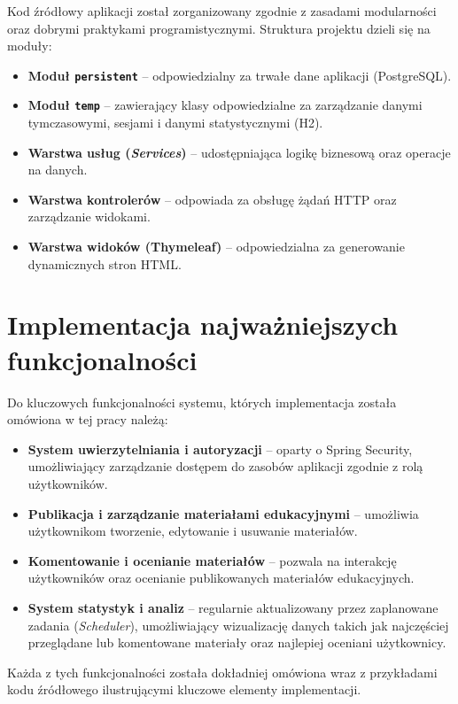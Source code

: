 Kod źródłowy aplikacji został zorganizowany zgodnie z zasadami modularności oraz dobrymi praktykami programistycznymi. Struktura projektu dzieli się na moduły:

\begin{itemize}
    \item \textbf{Moduł \texttt{persistent}} – odpowiedzialny za trwałe dane aplikacji (PostgreSQL).
    \item \textbf{Moduł \texttt{temp}} – zawierający klasy odpowiedzialne za zarządzanie danymi tymczasowymi, sesjami i danymi statystycznymi (H2).
    \item \textbf{Warstwa usług (\textit{Services})} – udostępniająca logikę biznesową oraz operacje na danych.
    \item \textbf{Warstwa kontrolerów} – odpowiada za obsługę żądań HTTP oraz zarządzanie widokami.
    \item \textbf{Warstwa widoków (Thymeleaf)} – odpowiedzialna za generowanie dynamicznych stron HTML.
\end{itemize}

\section{Implementacja najważniejszych funkcjonalności}

Do kluczowych funkcjonalności systemu, których implementacja została omówiona w tej pracy należą:

\begin{itemize}
    \item \textbf{System uwierzytelniania i autoryzacji} – oparty o Spring Security, umożliwiający zarządzanie dostępem do zasobów aplikacji zgodnie z rolą użytkowników.
    \item \textbf{Publikacja i zarządzanie materiałami edukacyjnymi} – umożliwia użytkownikom tworzenie, edytowanie i usuwanie materiałów.
    \item \textbf{Komentowanie i ocenianie materiałów} – pozwala na interakcję użytkowników oraz ocenianie publikowanych materiałów edukacyjnych.
    \item \textbf{System statystyk i analiz} – regularnie aktualizowany przez zaplanowane zadania (\textit{Scheduler}), umożliwiający wizualizację danych takich jak najczęściej przeglądane lub komentowane materiały oraz najlepiej oceniani użytkownicy.
\end{itemize}

Każda z tych funkcjonalności została dokładniej omówiona wraz z przykładami kodu źródłowego ilustrującymi kluczowe elementy implementacji.

